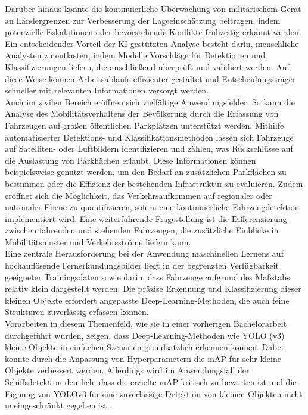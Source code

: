 Darüber hinaus könnte die kontinuierliche Überwachung von militärischem Gerät an Ländergrenzen zur Verbesserung der Lageeinschätzung beitragen, indem potenzielle Eskalationen oder bevorstehende Konflikte frühzeitig erkannt werden. Ein entscheidender Vorteil der KI-gestützten Analyse besteht darin, menschliche Analysten zu entlasten, indem Modelle Vorschläge für Detektionen und Klassifizierungen liefern, die anschließend überprüft und validiert werden. Auf diese Weise können Arbeitsabläufe effizienter gestaltet und Entscheidungsträger schneller mit relevanten Informationen versorgt werden. \\

Auch im zivilen Bereich eröffnen sich vielfältige Anwendungsfelder. So kann die Analyse des Mobilitätsverhaltens der Bevölkerung durch die Erfassung von Fahrzeugen auf großen öffentlichen Parkplätzen unterstützt werden. Mithilfe automatisierter Detektions- und Klassifikationsmethoden lassen sich Fahrzeuge auf Satelliten- oder Luftbildern identifizieren und zählen, was Rückschlüsse auf die Auslastung von Parkflächen erlaubt. Diese Informationen können beispielsweise genutzt werden, um den Bedarf an zusätzlichen Parkflächen zu bestimmen oder die Effizienz der bestehenden Infrastruktur zu evaluieren. Zudem eröffnet sich die Möglichkeit, das Verkehrsaufkommen auf regionaler oder nationaler Ebene zu quantifizieren, sofern eine kontinuierliche Fahrzeugdetektion implementiert wird. Eine weiterführende Fragestellung ist die Differenzierung zwischen fahrenden und stehenden Fahrzeugen, die zusätzliche Einblicke in Mobilitätsmuster und Verkehrsströme liefern kann. \\

Eine zentrale Herausforderung bei der Anwendung maschinellen Lernens auf hochauflösende Fernerkundungsbilder liegt in der begrenzten Verfügbarkeit geeigneter Trainingsdaten sowie darin, dass Fahrzeuge aufgrund des Maßstabs relativ klein dargestellt werden. Die präzise Erkennung und Klassifizierung dieser kleinen Objekte erfordert angepasste Deep-Learning-Methoden, die auch feine Strukturen zuverlässig erfassen können. \\

Vorarbeiten in diesem Themenfeld, wie sie in einer vorherigen Bachelorarbeit durchgeführt wurden, zeigen, dass Deep-Learning-Methoden wie \acrfull{YOLO} (v3) kleine Objekte in einfachen Szenarien grundsätzlich erkennen können. Dabei konnte durch die Anpassung von Hyperparametern die \acrfull{mAP} für sehr kleine Objekte verbessert werden. Allerdings wird im Anwendungsfall der Schiffsdetektion deutlich, dass die erzielte mAP kritisch zu bewerten ist und die Eignung von YOLOv3 für eine zuverlässige Detektion von kleinen Objekten nicht uneingeschränkt gegeben ist \cite{Balzer2022}. \\

